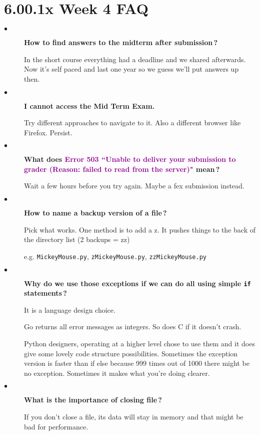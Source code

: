 \documentclass{article}
\newcommand{\inlinecode}[1]{\texttt{#1}}
\newcommand{\question}[1]{\item[$\bullet$] 
	\begin{minipage}[t]{\textwidth}
		\bfseries#1
	\end{minipage}
	\hfil
}
\newenvironment{answer}{}{}
\newenvironment{faq}{\begin{description}}{\end{description}}
\begin{document}
	
	\section*{\Huge6.00.1x Week 4 FAQ}
	
	\begin{faq}
		\question{How to find answers to the midterm after submission\,?}
		\begin{answer}
			In the short course everything had a deadline and we shared afterwards. Now it's self paced and last one year so we guess we'll put answers up then.
		\end{answer}
		
		\question{I cannot access the Mid Term Exam.}
		\begin{answer}
			Try different approaches to navigate to it. Also a different browser like Firefox. Persist.
		\end{answer}
		
		\question{What does \textcolor[HTML]{900090}{Error 503 ``Unable to deliver your submission to grader (Reason: failed to read from the server)"} mean\,?}
		\begin{answer}
			Wait a few hours before you try again. Maybe a fex submission instead.
		\end{answer}
		
		\question{How to name a backup version of a file\,?}
		\begin{answer}
			Pick what works. One method is to add a z. It pushes things to the back of the directory list (2 backups = zz)
			
			e.g. \inlinecode{MickeyMouse.py}, \inlinecode{zMickeyMouse.py}, \inlinecode{zzMickeyMouse.py}
		\end{answer}
		
		\question{Why do we use those exceptions if we can do all using simple \inlinecode{if} statements\,?}
		\begin{answer}
			It is a language design choice.
			
			Go returns all error messages as integers. So does C if it doesn't crash.
			
			Python designers, operating at a higher level chose to use them and it does give some lovely code structure possibilities. Sometimes the exception version is faster than if else because 999 times out of 1000 there might be no exception. Sometimes it makes what you're doing clearer.
		\end{answer}
		
		\question{What is the importance of closing file\,?}
		\begin{answer}
			If you don't close a file, its data will stay in memory and that might be bad for performance.
		\end{answer}
		

\end{faq}
\end{document}
